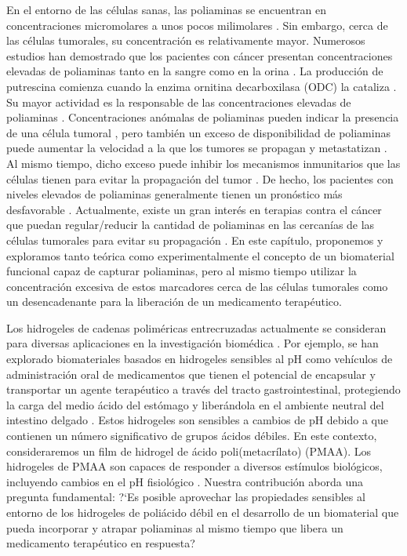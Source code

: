 En el entorno de las c\'elulas sanas, las poliaminas se encuentran en concentraciones micromolares a unos pocos milimolares \cite{porter1983, Russell}.
Sin embargo, cerca de las c\'elulas tumorales, su concentraci\'on es relativamente mayor.
Numerosos estudios han demostrado que los pacientes con c\'ancer presentan concentraciones elevadas de poliaminas tanto en la sangre como en la orina \cite{russell1971}. La producci\'on de putrescina comienza cuando la enzima ornitina decarboxilasa (ODC) la cataliza \cite{Soda2011,casero2009,pegg2010}. Su mayor actividad es la responsable de las concentraciones elevadas de poliaminas \cite{Soda2011,agostinelli2010polyamines,nowotarski2013}.
Concentraciones an\'omalas de poliaminas pueden indicar la presencia de una c\'elula tumoral \cite{park2013,gerner2004}, pero tambi\'en un exceso de disponibilidad de poliaminas puede aumentar la velocidad a la que los tumores se propagan y metastatizan \cite{Soda2011}.
Al mismo tiempo, dicho exceso puede inhibir los mecanismos inmunitarios que las c\'elulas tienen para evitar la propagaci\'on del tumor \cite{Soda2011,jasnis1994polyamines}.
De hecho, los pacientes con niveles elevados de poliaminas generalmente tienen un pron\'ostico m\'as desfavorable \cite{Soda2011,ikeda2011montmorillonite}.
Actualmente, existe un gran inter\'es en terapias contra el c\'ancer que puedan regular/reducir la cantidad de poliaminas en las cercan\'ias de las c\'elulas tumorales para evitar su propagaci\'on \cite{Soda2011,aziz1996potential,chen2006combination, bachrach2004polyamines}.
En este cap\'itulo, proponemos y exploramos tanto te\'orica como experimentalmente el concepto de un biomaterial funcional capaz de capturar poliaminas, pero al mismo tiempo utilizar la concentraci\'on excesiva de estos marcadores cerca de las c\'elulas tumorales como un desencadenante para la liberaci\'on de un medicamento terap\'eutico.

Los hidrogeles de cadenas polim\'ericas entrecruzadas actualmente se consideran para diversas aplicaciones en la investigaci\'on biom\'edica \cite{wang2019}.
Por ejemplo, se han explorado biomateriales basados en hidrogeles sensibles al pH como veh\'iculos de administraci\'on oral de medicamentos que tienen el potencial de encapsular y transportar un agente terap\'eutico a trav\'es del tracto gastrointestinal, protegiendo la carga del medio \'acido del est\'omago y liber\'andola en el ambiente neutral del intestino delgado  \cite{lowman1999oral,zhao2019,qindeel2019,Li2019}.
Estos hidrogeles son sensibles a cambios de pH debido a que contienen un n\'umero significativo de grupos \'acidos d\'ebiles.
En este contexto, consideraremos un film de hidrogel de \'acido poli(metacr\'ilato) (PMAA).
Los hidrogeles de PMAA son capaces de responder a diversos est\'imulos biol\'ogicos, incluyendo cambios en el pH fisiol\'ogico \cite{kanamala2016mechanisms}.
Nuestra contribuci\'on aborda una pregunta fundamental: ?`Es posible aprovechar las propiedades sensibles al entorno de los hidrogeles de poli\'acido d\'ebil en el desarrollo de un biomaterial que pueda incorporar y atrapar poliaminas al mismo tiempo que libera un medicamento terap\'eutico en respuesta?

